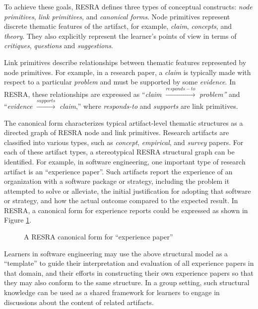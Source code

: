 To achieve these goals, RESRA defines three types of conceptual constructs:
{\it node primitives\/}, {\it link primitives}, and {\it canonical
forms}. Node primitives represent discrete thematic features of the
artifact, for example, {\it claim\/}, {\it concepts}, and {\it
theory\/}. They also explicitly represent the learner's points of view in
terms of {\it critiques\/}, {\it questions\/} and {\it suggestions\/}.

Link primitives describe relationships between thematic features
represented by node primitives. For example, in a research paper, a {\it
claim\/} is typically made with respect to a particular {\it problem\/} and
must be supported by some {\it evidence\/}. In RESRA, these relationships
are expressed as ``{\it claim\/} \( \stackrel{responds-to}{\longrightarrow}
\) {\it problem''\/} and ``{\it evidence\/}
\(\stackrel{supports}{\longrightarrow}\) {\it claim\/},'' where {\it
responds-to\/} and {\it supports\/} are link primitives.
   
The canonical form characterizes typical artifact-level thematic structures
as a directed graph of RESRA node and link primitives. Research artifacts
are classified into various types, such as {\it concept}, {\it empirical},
and {\it survey\/} papers. For each of these artifact types, a
stereotypical RESRA structural graph can be identified. For example, in
software engineering, one important type of research artifact is an
``experience paper''. Such artifacts report the experience of an
organization with a software package or strategy, including the problem it
attempted to solve or alleviate, the initial justification for adopting
that software or strategy, and how the actual outcome compared to the
expected result. In RESRA, a canonical form for experience reports could be
expressed as shown in Figure \ref{fig:experience-crf}.

\begin{figure}[htb]
 \centerline{}
  \caption{A RESRA canonical form for ``experience paper''} 
  \label{fig:experience-crf}
\end{figure}

Learners in software engineering may use the above structural model as a
``template'' to guide their interpretation and evaluation of all experience
papers in that domain, and their efforts in constructing their own
experience papers so that they may also conform to the same structure. In a
group setting, such structural knowledge can be used as a shared framework
for learners to engage in discussions about the content of related
artifacts.

